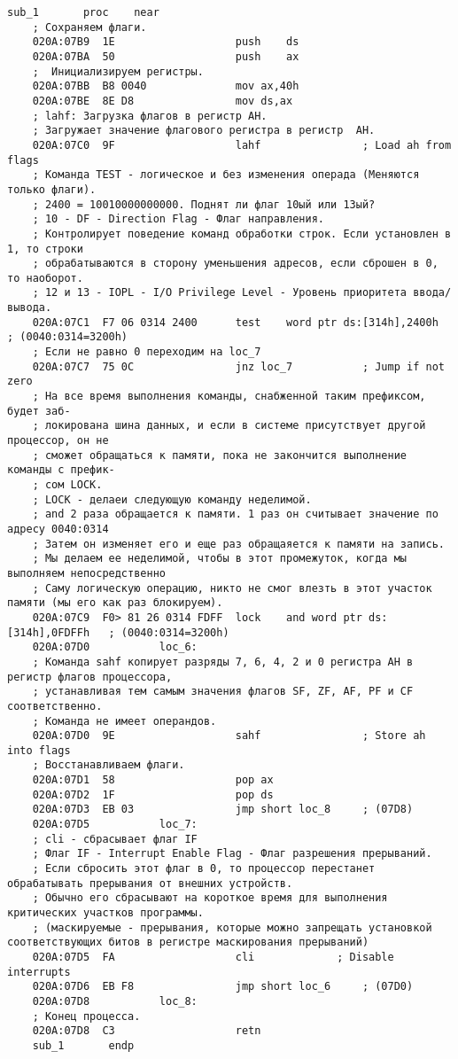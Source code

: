 \documentclass[12pt,a4paper]{report}
\begin{document}
    \begin{lstlisting}[label=some-code,caption=Код подпрограммы sub\_1]
                    sub_1		proc	near
    ; Сохраняем флаги.
    020A:07B9  1E					push	ds
    020A:07BA  50					push	ax
    ;  Инициализируем регистры.
    020A:07BB  B8 0040				mov	ax,40h
    020A:07BE  8E D8				mov	ds,ax
    ; lahf: Загрузка флагов в регистр АН.
    ; Загружает значение флагового регистра в регистр  АН. 
    020A:07C0  9F					lahf				; Load ah from flags
    ; Команда TEST - логическое и без изменения операда (Меняются только флаги).
    ; 2400 = 10010000000000. Поднят ли флаг 10ый или 13ый?
    ; 10 - DF - Direction Flag - Флаг направления. 
    ; Контролирует поведение команд обработки строк. Если установлен в 1, то строки 
    ; обрабатываются в сторону уменьшения адресов, если сброшен в 0, то наоборот.
    ; 12 и 13 - IOPL - I/O Privilege Level - Уровень приоритета ввода/вывода.
    020A:07C1  F7 06 0314 2400		test	word ptr ds:[314h],2400h	; (0040:0314=3200h)
    ; Если не равно 0 переходим на loc_7
    020A:07C7  75 0C				jnz	loc_7			; Jump if not zero
    ; На все время выполнения команды, снабженной таким префиксом, будет заб-
    ; локирована шина данных, и если в системе присутствует другой процессор, он не
    ; сможет обращаться к памяти, пока не закончится выполнение команды с префик-
    ; сом LOCK.
    ; LOCK - делаеи следующую команду неделимой.
    ; and 2 раза обращается к памяти. 1 раз он считывает значение по адресу 0040:0314
    ; Затем он изменяет его и еще раз обращаяется к памяти на запись.
    ; Мы делаем ее неделимой, чтобы в этот промежуток, когда мы выполняем непосредственно
    ; Саму логическую операцию, никто не смог влезть в этот участок памяти (мы его как раз блокируем).
    020A:07C9  F0> 81 26 0314 FDFF  lock	and	word ptr ds:[314h],0FDFFh	; (0040:0314=3200h)
    020A:07D0			loc_6:
    ; Команда sahf копирует разряды 7, 6, 4, 2 и 0 регистра АН в регистр флагов процессора, 
    ; устанавливая тем самым значения флагов SF, ZF, AF, PF и CF соответственно. 
    ; Команда не имеет операндов.
    020A:07D0  9E					sahf				; Store ah into flags
    ; Восстанавливаем флаги.
    020A:07D1  58					pop	ax
    020A:07D2  1F					pop	ds
    020A:07D3  EB 03				jmp	short loc_8		; (07D8)
    020A:07D5			loc_7:
    ; cli - сбрасывает флаг IF
    ; Флаг IF - Interrupt Enable Flag - Флаг разрешения прерываний.
    ; Если сбросить этот флаг в 0, то процессор перестанет обрабатывать прерывания от внешних устройств.
    ; Обычно его сбрасывают на короткое время для выполнения критических участков программы.
    ; (маскируемые - прерывания, которые можно запрещать установкой соответствующих битов в регистре маскирования прерываний)
    020A:07D5  FA					cli				; Disable interrupts
    020A:07D6  EB F8				jmp	short loc_6		; (07D0)
    020A:07D8			loc_8:
    ; Конец процесса.
    020A:07D8  C3					retn
    sub_1		endp
    \end{lstlisting}
\end{document}
